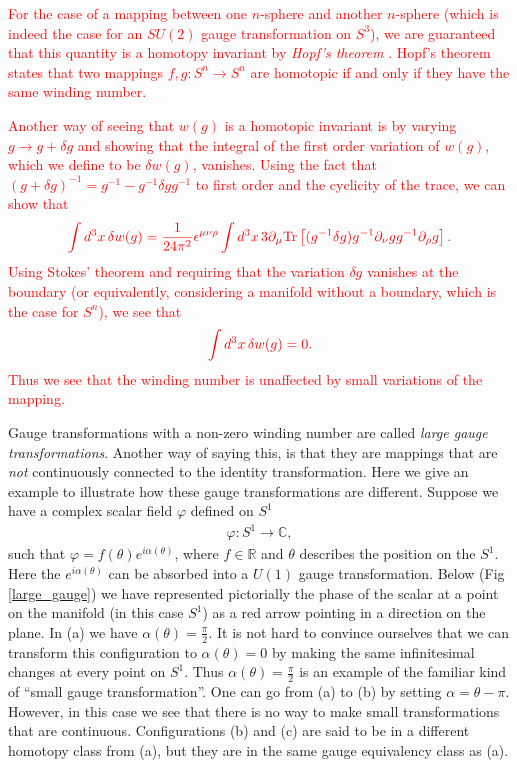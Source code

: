     \textcolor{red}{For the case of a mapping between one $n$-sphere and another $n$-sphere (which is indeed the case  for an $SU(2)$ gauge transformation on $S^3$), we are guaranteed that this quantity is a homotopy invariant by \textit{Hopf's theorem} \cite{Dugundji}. Hopf's theorem states that two mappings $f,g: S^n \rightarrow S^n$ are homotopic if and only if they have the same winding number.}

    \textcolor{red}{Another way of seeing that $w(g)$ is a homotopic invariant is by varying $g\rightarrow g+\delta g$ and showing that the integral of the first order variation of $w(g)$, which we define to be $\delta w(g)$, vanishes. Using the fact that $(g+\delta g)^{-1} = g^{-1} - g^{-1} \delta g g^{-1}$ to first order and the cyclicity of the trace, we can show that}
\begin{align}
    \textcolor{red}{   \int d^3x \, \delta w(g) = \frac{1}{24 \pi^2} \epsilon^{\mu \nu \rho} \int d^3 x \, 3 \partial_{\mu}\mathrm{Tr} \left[(g^{-1} \delta g) g^{-1} \partial_{\nu} g g^{-1} \partial_{\rho} g \right].}
\end{align}
\textcolor{red}{Using Stokes' theorem and requiring that the variation $\delta g$ vanishes at the boundary (or equivalently, considering a manifold without a boundary, which is the case for $S^n$), we see that}
\begin{align}
    \textcolor{red}{ \int d^3 x \, \delta w(g) =0.}
\end{align}
\textcolor{red}{Thus we see that the winding number is unaffected by small variations of the mapping.}

    Gauge transformations with a non-zero winding number are called \textit{large gauge transformations}. Another way of saying this, is that they are mappings that are \textit{not} continuously connected to the identity transformation. Here we give an example to illustrate how these gauge transformations are different.
    Suppose we have a complex scalar field $\varphi$ defined on  $S^1$
    \begin{align}
        \varphi: S^1 \rightarrow \mathbb{C},
    \end{align}
    such that $\varphi = f(\theta) e^{i \alpha(\theta)}$, where $f\in \mathbb{R}$ and $\theta$ describes the position on the $S^1$. Here the $e ^{i \alpha (\theta)}$ can be absorbed into a $U(1)$ gauge transformation. Below (Fig \ref{large_gauge}) we have represented pictorially the phase of the scalar at a point on the manifold (in this case $S^1$) as a red arrow pointing in a direction on the plane. In (a) we have $\alpha(\theta) = \frac{\pi}{2}$. It is not hard to convince ourselves that we can transform this configuration to $\alpha(\theta) =0$ by making the same infinitesimal changes at every point on $S^1$. Thus $\alpha(\theta) = \frac{\pi}{2}$ is an example of the familiar kind of ``small gauge transformation''. One can go from (a) to (b) by setting $\alpha =\theta - \pi$. However, in this case we see that there is no way to make small transformations that are continuous. Configurations (b) and (c) are said to be in a different homotopy class from (a), but they are in the same gauge equivalency class as (a).
    


